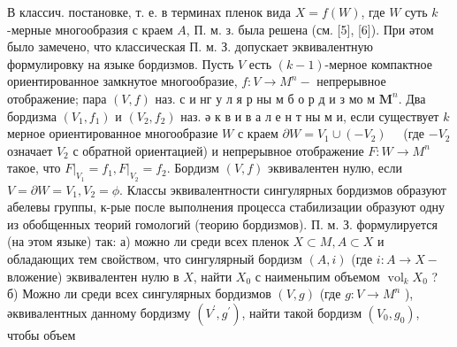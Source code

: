 \documentclass[10pt]{article}
\begin{document}
В классич. постановке, т. е. в терминах пленок вида $X=f(W)$, где $W$ суть $k$-мерные многообразия с краем $A$, П. м. з. была решена (см. [5], [6]). При әтом было замечено, что классическая П. м. З. допускает эквивалентную формулировку на языке бордизмов. Пусть $V$ есть $(k-1)$-мерное компактное ориентированное замкнутое многообразие, $f: V \rightarrow M^{n}-$ непрерывное отображение; пара $(V, f)$ наз. с и нг у л я р ны м б о р д и з мо м $\boldsymbol{M}^{n}$. Два бордизма $\left(V_{1}, f_{1}\right)$ и $\left(V_{2}, f_{2}\right)$ наз. ә к в и в а л е н т ны м и, если существует $k$ мерное ориентированное многообразие $W$ с краем $\partial W=V_{1} \cup\left(-V_{2}\right) \quad$ (где $-V_{2}$ означает $V_{2}$ с обратной ориентацией) и непрерывное отображение $F: W \rightarrow M^{n}$ такое, что $\left.F\right|_{V_{1}}=f_{1},\left.F\right|_{V_{2}}=f_{2}$. Бордизм $(V, f)$ эквивалентен нулю, если $V=\partial W=V_{1}, V_{2}=\phi$. Классы эквивалентности сингулярных бордизмов образуют абелевы группы, к-рые после выполнения процесса стабилизации образуют одну из обобщенных теорий гомологий (теорию бордизмов). П. м. З. формулируется (на этом языке) так: а) можно ли среди всех пленок $X \subset M, A \subset X$ и обладающих тем свойством, что сингулярный бордизм $(A, i)$ (где $i: A \rightarrow X-$ вложение) эквивалентен нулю в $X$, найти $X_{0}$ с наименьпим объемом $\operatorname{vol}_{k} X_{0}$ ? б) Можно ли среди всех сингулярных бордизмов $(V, g)$ (где $g: V \rightarrow M^{n}$ ), әквивалентных данному бордизму $\left(V^{\prime}, g^{\prime}\right)$, найти такой бордизм $\left(V_{0}, g_{0}\right)$, чтобы объем
\end{document}
